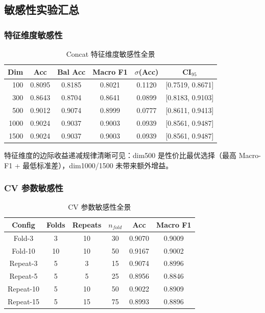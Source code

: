 \subsection{敏感性实验汇总}

\subsubsection{特征维度敏感性}

\begin{table}[htbp]
\centering
\caption{Concat 特征维度敏感性全景}
\label{tab:dim_sensitivity_full}
\begin{tabular}{|r|ccccc|}
\hline
\textbf{Dim} & \textbf{Acc} & \textbf{Bal Acc} & \textbf{Macro F1} & $\sigma$(Acc) & CI$_{95}$ \\
\hline
100 & 0.8095 & 0.8185 & 0.8021 & 0.1120 & [0.7519, 0.8671] \\
300 & 0.8643 & 0.8704 & 0.8641 & 0.0899 & [0.8183, 0.9103] \\
500 & 0.9012 & 0.9074 & 0.8999 & 0.0777 & [0.8611, 0.9413] \\
1000 & 0.9024 & 0.9037 & 0.9003 & 0.0939 & [0.8561, 0.9487] \\
1500 & 0.9024 & 0.9037 & 0.9003 & 0.0939 & [0.8561, 0.9487] \\
\hline
\end{tabular}
\end{table}

特征维度的边际收益递减规律清晰可见：dim500 是性价比最优选择（最高 Macro-F1 + 最低标准差），dim1000/1500 未带来额外增益。

\subsubsection{CV 参数敏感性}

\begin{table}[htbp]
\centering
\caption{CV 参数敏感性全景}
\label{tab:cv_sensitivity_full}
\begin{tabular}{|cccccc|}
\hline
\textbf{Config} & \textbf{Folds} & \textbf{Repeats} & $n_{fold}$ & \textbf{Acc} & \textbf{Macro F1} \\
\hline
Fold-3 & 3 & 10 & 30 & 0.9070 & 0.9009 \\
Fold-10 & 10 & 10 & 50 & 0.9167 & 0.9002 \\
Repeat-3 & 5 & 3 & 15 & 0.9074 & 0.8996 \\
Repeat-5 & 5 & 5 & 25 & 0.8956 & 0.8846 \\
Repeat-10 & 5 & 10 & 50 & 0.9022 & 0.8909 \\
Repeat-15 & 5 & 15 & 75 & 0.8993 & 0.8896 \\
\hline
\end{tabular}
\end{table}

